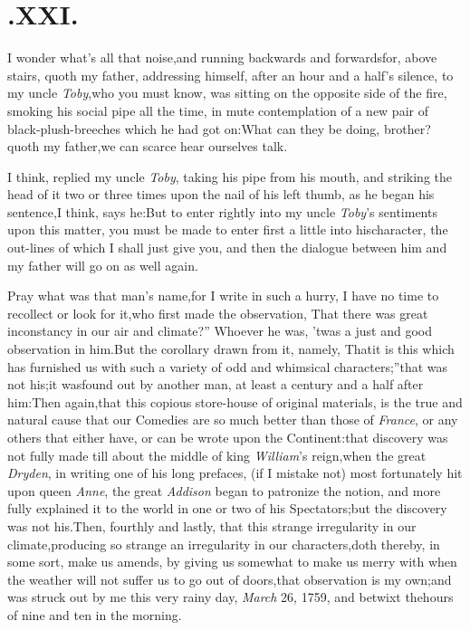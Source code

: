 \documentclass{article}
\begin{document}
\section{.\enspace XXI.}

\quad\tsh  I wonder what’s
all that noise,\break and running backwards and forwards\break for, above
stairs, quoth my father, addressing himself, after an hour and a\break
half’s silence, to my uncle \textit{Toby},\tsh  who
you must know, was sitting on the opposite side of the fire,
smoking his social pipe all the time, in mute contemplation of a
new pair of black-plush-breeches\break
which he had got on:\tsk  What
can they be doing, brother?  quoth my father,\tsk\break  we can
scarce hear ourselves talk.

I think, replied my uncle \textit{Toby}, taking his pipe from his
mouth, and striking the head of it two or three times upon the nail
of his left thumb, as he began his sentence,\tsh  I think,
says he:\tsh\break  But to enter rightly into my uncle
\textit{Toby}’s sentiments upon this matter, you must be made
to enter first a little into his\break character, the out-lines of which
I shall just give you, and then the dialogue between
him and my father will go on as well again.

\tsk Pray what was that man’s name,\tsk\break  for I write in such a
hurry, I have no time to recollect or look for it,\tsh  who
first made the observation, \lqq That there was great
inconstancy in our air and climate?” Whoever he was,
’twas a just and good observation in him.\tsk  But the
corollary drawn from it, namely, \lqq That\break it is this which
has furnished us with such a variety of odd and whimsical
characters;”\tsk  that was not his;\tsk  it was\break found out
by another man, at least a century and a half after him:\tsk Then\break
again,\tsk  that this copious store-house of original materials,
is the true and natural cause that our Comedies are so much better
than those of \textit{France}, or any others that either have, or can
be wrote upon the Continent:\tsh  that discovery was not
fully made till about the middle of king \textit{William}’s
reign,\tsk  when the great \textit{Dryden}, in writing one of his
long prefaces, (if I mistake not) most fortunately hit upon\break
{}
queen \textit{Anne}, the great \textit{Addison} began to
patronize the notion, and more fully explained it to the world in
one or two of his Spectators;\tsk  but the discovery was not
his.\tsk  Then, fourthly and lastly, that this strange
irregularity in our climate,\break producing so strange an irregularity
in our characters,\tsh  doth thereby, in some sort, make us
amends, by giving us somewhat to make us merry with when the
weather will not suffer us to go out of doors,\tsk  that
observation is my own;\tsk\break  and was struck out by me this very
rainy day, \textit{March} 26, 1759, and betwixt the\break hours of nine and
ten in the morning.
\end{document}
